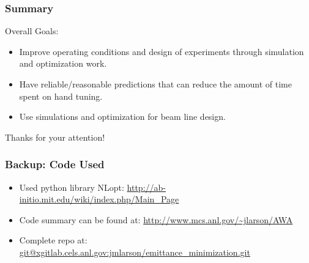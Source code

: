 \documentclass[professionalfonts,t]{beamer}
\begin{document}


\begin{frame}
	\frametitle{Summary}
	Overall Goals: 
	
	\begin{itemize}
		\item Improve operating conditions and design of experiments through simulation and optimization work.
		\item Have reliable/reasonable predictions that can reduce the amount of time spent on hand tuning.
		\item Use simulations and optimization for beam line design.
	\end{itemize}
	
	\vspace{1em}
	\centering
	\color{blue}\huge{Thanks for your attention!}

\end{frame}



\begin{frame}
\frametitle{Backup: Code Used}
\begin{itemize}
	\setlength\itemsep{2em}
	\item Used python library NLopt: \url{http://ab-initio.mit.edu/wiki/index.php/Main_Page}
	
	\item Code summary can be found at: \url{http://www.mcs.anl.gov/~jlarson/AWA}
	
	\item Complete repo at: \url{git@xgitlab.cels.anl.gov:jmlarson/emittance_minimization.git}
\end{itemize}	
\end{frame}
\end{document}
